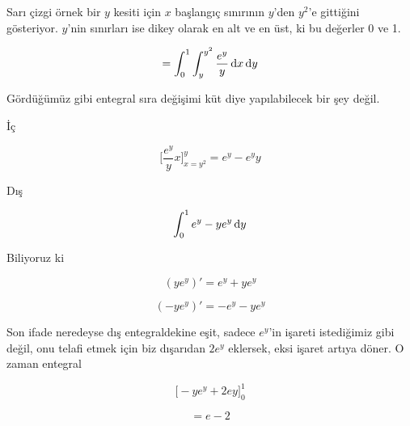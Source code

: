 \documentclass[12pt,fleqn]{article}\usepackage{../../common}
\begin{document}
Sarı çizgi örnek bir $y$ kesiti için $x$ başlangıç sınırının $y$'den
$y^2$'e gittiğini gösteriyor. $y$'nin sınırları ise dikey olarak en alt ve
en üst, ki bu değerler 0 ve 1. 

$$ = \int_0^1 \int_y^{y^2}  \frac{e^y}{y} \,\mathrm{d} x \,\mathrm{d} y $$

Gördüğümüz gibi entegral sıra değişimi küt diye yapılabilecek bir şey
değil. 

İç

$$
\bigg[ \frac{e^y}{y}x \bigg]_{x=y^2}^{y} =  e^y - e^yy
$$

Dış

$$ \int_0^1 e^y - ye^y \,\mathrm{d} y  $$

Biliyoruz ki 

$$ (ye^y)' = e^y + ye^y $$

$$ (-ye^y)' = -e^y - ye^y $$

Son ifade neredeyse dış entegraldekine eşit, sadece $e^y$'in işareti
istediğimiz gibi değil, onu telafi etmek için biz dışarıdan $2e^y$
eklersek, eksi işaret artıya döner. O zaman entegral 

$$ \bigg[ -ye^y + 2ey \bigg]_0^1 $$

$$ = e - 2 $$
\end{document}
